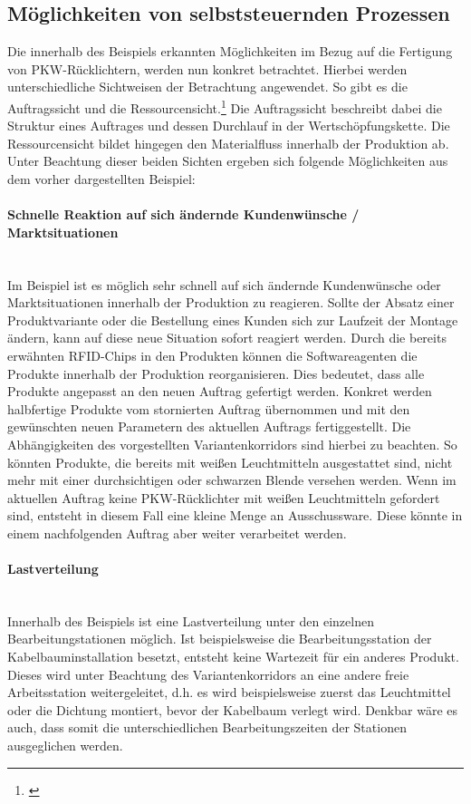 \subsection{Möglichkeiten von selbststeuernden Prozessen}
\label{sec:Moeglichkeiten}

Die innerhalb des Beispiels erkannten Möglichkeiten im Bezug auf die Fertigung
von PKW-Rücklichtern, werden nun konkret betrachtet. Hierbei werden
unterschiedliche Sichtweisen der Betrachtung angewendet. So gibt es die
Auftragssicht und die Ressourcensicht.\footnote{\citet[S.~234]{arnold2008}}
Die Auftragssicht beschreibt dabei die Struktur eines Auftrages und dessen Durchlauf in der Wertschöpfungskette. Die
Ressourcensicht bildet hingegen den Materialfluss innerhalb der Produktion ab.
Unter Beachtung dieser beiden Sichten ergeben sich folgende Möglichkeiten aus
dem vorher dargestellten Beispiel:

\paragraph{Schnelle Reaktion auf sich ändernde Kundenwünsche /
Marktsituationen} \hfill \\
Im Beispiel ist es möglich sehr schnell auf sich ändernde Kundenwünsche oder
Marktsituationen innerhalb der Produktion zu reagieren. Sollte der Absatz einer
Produktvariante oder die Bestellung eines Kunden sich zur Laufzeit der Montage
ändern, kann auf diese neue Situation sofort reagiert werden. Durch die bereits
erwähnten RFID-Chips in den Produkten können die Softwareagenten die Produkte
innerhalb der Produktion reorganisieren. Dies bedeutet, dass alle Produkte
angepasst an den neuen Auftrag gefertigt werden. Konkret werden halbfertige
Produkte vom stornierten Auftrag übernommen und mit den gewünschten neuen
Parametern des aktuellen Auftrags fertiggestellt. Die Abhängigkeiten des
vorgestellten Variantenkorridors sind hierbei zu beachten. So könnten Produkte,
die bereits mit weißen Leuchtmitteln ausgestattet sind, nicht mehr mit einer
durchsichtigen oder schwarzen Blende versehen werden. Wenn im aktuellen Auftrag
keine PKW-Rücklichter mit weißen Leuchtmitteln gefordert sind, entsteht in
diesem Fall eine kleine Menge an Ausschussware. Diese könnte in einem
nachfolgenden Auftrag aber weiter verarbeitet werden.

\paragraph{Lastverteilung} \hfill \\
Innerhalb des Beispiels ist eine Lastverteilung unter den einzelnen
Bearbeitungstationen möglich. Ist beispielsweise die Bearbeitungsstation der
Kabelbauminstallation besetzt, entsteht keine Wartezeit für ein anderes Produkt.
Dieses wird unter Beachtung des Variantenkorridors an eine andere freie
Arbeitsstation weitergeleitet, d.h. es wird beispielsweise zuerst das
Leuchtmittel oder die Dichtung montiert, bevor der Kabelbaum verlegt wird.
Denkbar wäre es auch, dass somit die unterschiedlichen Bearbeitungszeiten der
Stationen ausgeglichen werden.

